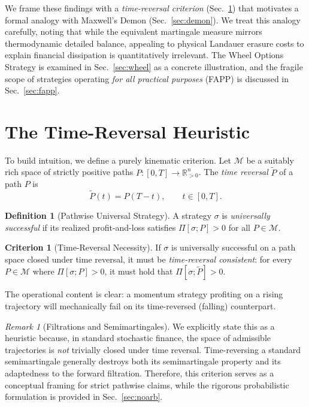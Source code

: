\documentclass[aps,pra,reprint,superscriptaddress,amsmath,amssymb]{revtex4-2}
\theoremstyle{plain}
\theoremstyle{definition}
\newtheorem{definition}{Definition}
\newtheorem{criterion}{Criterion}
\theoremstyle{remark}
\newtheorem{remark}{Remark}
\begin{document}
We frame these findings with a \emph{time-reversal criterion} (Sec.~\ref{sec:criterion}) that motivates a formal analogy with Maxwell's Demon (Sec.~\ref{sec:demon}). We treat this analogy carefully, noting that while the equivalent martingale measure mirrors thermodynamic detailed balance, appealing to physical Landauer erasure costs to explain financial dissipation is quantitatively irrelevant. The Wheel Options Strategy is examined in Sec.~\ref{sec:wheel} as a concrete illustration, and the fragile scope of strategies operating \emph{for all practical purposes} (FAPP) is discussed in Sec.~\ref{sec:fapp}.

\section{The Time-Reversal Heuristic}
\label{sec:criterion}

To build intuition, we define a purely kinematic criterion. Let $\mathcal{M}$ be a suitably rich space of strictly positive paths $P\colon[0,T]\to\mathbb{R}_{>0}^n$. The \emph{time reversal} $\widetilde{P}$ of a path $P$ is
\begin{equation}
  \widetilde{P}(t) = P(T-t), \qquad t\in[0,T].
  \label{eq:timereversal}
\end{equation}

\begin{definition}[Pathwise Universal Strategy]
  A strategy $\sigma$ is \emph{universally successful} if its realized profit-and-loss satisfies $\Pi[\sigma;P]>0$ for all $P\in\mathcal{M}$.
\end{definition}

\begin{criterion}[Time-Reversal Necessity]
  \label{crit:tr}
  If $\sigma$ is universally successful on a path space closed under time reversal, it must be \emph{time-reversal consistent}: for every $P\in\mathcal{M}$ where $\Pi[\sigma;P]>0$, it must hold that $\Pi[\sigma;\widetilde{P}]>0$.
\end{criterion}

The operational content is clear: a momentum strategy profiting on a rising trajectory will mechanically fail on its time-reversed (falling) counterpart.

\begin{remark}[Filtrations and Semimartingales]
We explicitly state this as a heuristic because, in standard stochastic finance, the space of admissible trajectories is \emph{not} trivially closed under time reversal. Time-reversing a standard semimartingale generally destroys both its semimartingale property and its adaptedness to the forward filtration. Therefore, this criterion serves as a conceptual framing for strict pathwise claims, while the rigorous probabilistic formulation is provided in Sec.~\ref{sec:noarb}.
\end{remark}
\end{document}
